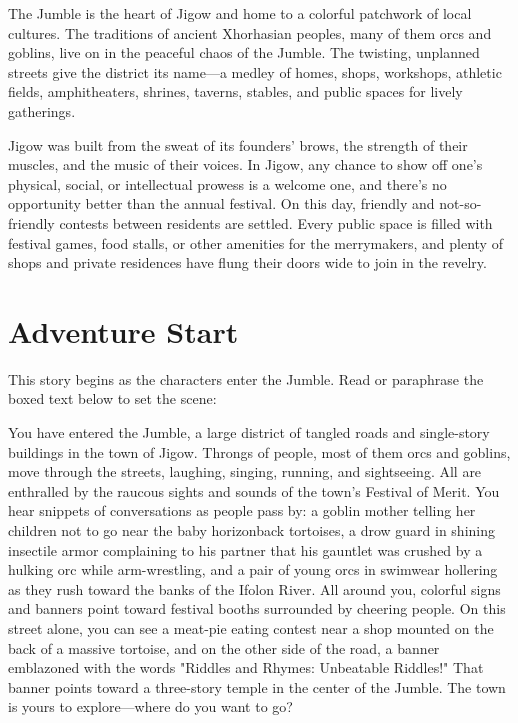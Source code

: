 \documentclass[a4paper, 11pt, bg=full, twocolumn, nooutline]{dndbook}
\begin{document}
The Jumble is the heart of Jigow and home to a colorful patchwork of local cultures. The traditions of ancient Xhorhasian peoples, many of them orcs and goblins, live on in the peaceful chaos of the Jumble. The twisting, unplanned streets give the district its name---a medley of homes, shops, workshops, athletic fields, amphitheaters, shrines, taverns, stables, and public spaces for lively gatherings.

Jigow was built from the sweat of its founders' brows, the strength of their muscles, and the music of their voices. In Jigow, any chance to show off one's physical, social, or intellectual prowess is a welcome one, and there's no opportunity better than the annual festival. On this day, friendly and not-so-friendly contests between residents are settled. Every public space is filled with festival games, food stalls, or other amenities for the merrymakers, and plenty of shops and private residences have flung their doors wide to join in the revelry.
\section{Adventure Start}

This story begins as the characters enter the Jumble. Read or paraphrase the boxed text below to set the scene:

\begin{DndReadAloud}
You have entered the Jumble, a large district of tangled roads and single-story buildings in the town of Jigow. Throngs of people, most of them orcs and goblins, move through the streets, laughing, singing, running, and sightseeing. All are enthralled by the raucous sights and sounds of the town's Festival of Merit.
You hear snippets of conversations as people pass by: a goblin mother telling her children not to go near the baby horizonback tortoises, a drow guard in shining insectile armor complaining to his partner that his gauntlet was crushed by a hulking orc while arm-wrestling, and a pair of young orcs in swimwear hollering as they rush toward the banks of the Ifolon River.
All around you, colorful signs and banners point toward festival booths surrounded by cheering people. On this street alone, you can see a meat-pie eating contest near a shop mounted on the back of a massive tortoise, and on the other side of the road, a banner emblazoned with the words "Riddles and Rhymes: Unbeatable Riddles!" That banner points toward a three-story temple in the center of the Jumble. The town is yours to explore---where do you want to go?
\end{DndReadAloud}
\end{document}
